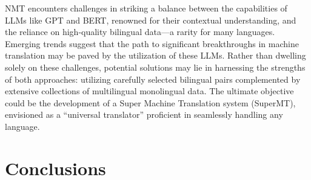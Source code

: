 \documentclass[acmsmall]{acmart}
\begin{document}
%
%


NMT encounters challenges in striking a balance between the capabilities of LLMs like GPT and BERT, renowned for their contextual understanding, and the reliance on high-quality bilingual data—a rarity for many languages. Emerging trends suggest that the path to significant breakthroughs in machine translation may be paved by the utilization of these LLMs. Rather than dwelling solely on these challenges, potential solutions may lie in harnessing the strengths of both approaches: utilizing carefully selected bilingual pairs complemented by extensive collections of multilingual monolingual data. The ultimate objective could be the development of a Super Machine Translation system (SuperMT), envisioned as a ``universal translator'' proficient in seamlessly handling any language.


\section{Conclusions}
\end{document}
